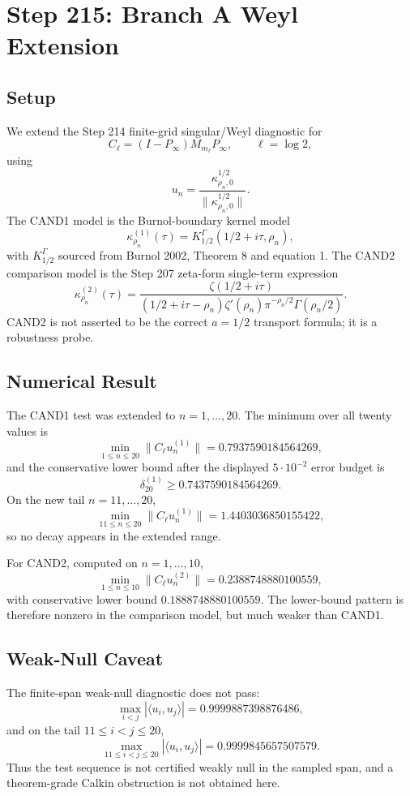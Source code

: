 \documentclass[11pt]{article}
\begin{document}
\section*{Step 215: Branch A Weyl Extension}

\subsection*{Setup}

We extend the Step 214 finite-grid singular/Weyl diagnostic for
\[
  C_\ell=(I-P_\infty)M_{m_\ell}P_\infty,\qquad \ell=\log 2,
\]
using
\[
  u_n=\frac{\kappa_{\rho_n,0}^{1/2}}{\|\kappa_{\rho_n,0}^{1/2}\|}.
\]
The CAND1 model is the Burnol-boundary kernel model
\[
  \kappa_{\rho_n}^{(1)}(\tau)=K_{1/2}^{\Gamma}(1/2+i\tau,\rho_n),
\]
with \(K_{1/2}^{\Gamma}\) sourced from Burnol 2002, Theorem 8 and equation 1.  The CAND2 comparison model is the Step 207 zeta-form single-term expression
\[
  \kappa_{\rho_n}^{(2)}(\tau)=
  \frac{\zeta(1/2+i\tau)}
  {(1/2+i\tau-\rho_n)\zeta'(\rho_n)\pi^{-\rho_n/2}\Gamma(\rho_n/2)}.
\]
CAND2 is not asserted to be the correct \(a=1/2\) transport formula; it is a robustness probe.

\subsection*{Numerical Result}

The CAND1 test was extended to \(n=1,\dots,20\).  The minimum over all twenty values is
\[
  \min_{1\le n\le 20}\|C_\ell u_n^{(1)}\|=0.7937590184564269,
\]
and the conservative lower bound after the displayed \(5\cdot 10^{-2}\) error budget is
\[
  \delta_{20}^{(1)}\ge 0.7437590184564269.
\]
On the new tail \(n=11,\dots,20\),
\[
  \min_{11\le n\le 20}\|C_\ell u_n^{(1)}\|=1.4403036850155422,
\]
so no decay appears in the extended range.

For CAND2, computed on \(n=1,\dots,10\),
\[
  \min_{1\le n\le 10}\|C_\ell u_n^{(2)}\|=0.2388748880100559,
\]
with conservative lower bound \(0.1888748880100559\).  The lower-bound pattern is therefore nonzero in the comparison model, but much weaker than CAND1.

\subsection*{Weak-Null Caveat}

The finite-span weak-null diagnostic does not pass:
\[
  \max_{i<j}|\langle u_i,u_j\rangle|=0.9999887398876486,
\]
and on the tail \(11\le i<j\le20\),
\[
  \max_{11\le i<j\le20}|\langle u_i,u_j\rangle|=0.9999845657507579.
\]
Thus the test sequence is not certified weakly null in the sampled span, and a theorem-grade Calkin obstruction is not obtained here.
\end{document}
